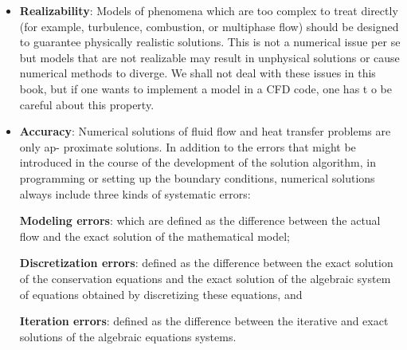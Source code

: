 \begin{itemize}
 \item \textbf{Realizability}: Models of phenomena which are too complex to treat directly (for example,
turbulence, combustion, or multiphase flow) should be designed to guarantee
physically realistic solutions. This is not a numerical issue per se but models
that are not realizable may result in unphysical solutions or cause numerical
methods to diverge. We shall not deal with these issues in this book, but if
one wants to implement a model in a CFD code, one has t o be careful about
this property.

 \item \textbf{Accuracy}: Numerical solutions of fluid flow and heat transfer problems are only ap-
proximate solutions. In addition to the errors that might be introduced in
the course of the development of the solution algorithm, in programming or
setting up the boundary conditions, numerical solutions always include three
kinds of systematic errors:

\textbf{Modeling errors}: which are defined as the difference between the actual
flow and the exact solution of the mathematical model;

\textbf{Discretization errors}: defined as the difference between the exact solution
of the conservation equations and the exact solution of the algebraic system
of equations obtained by discretizing these equations, and

\textbf{Iteration errors}: defined as the difference between the iterative and exact
solutions of the algebraic equations systems.


\end{itemize}
